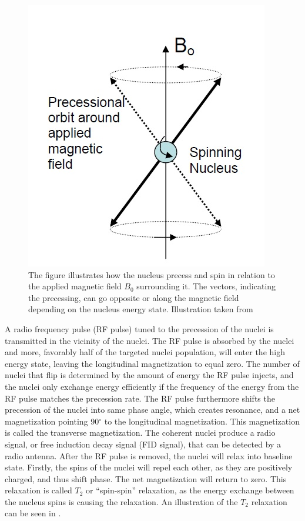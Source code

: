 \begin{figure}[H]                 
	\includegraphics[width=.375\textwidth]{figures/aBackground/nucleus_precess}  
	\caption{The figure illustrates how the nucleus precess and spin in relation to the applied magnetic field $B_0$ surrounding it. The vectors, indicating the precessing, can go opposite or along the magnetic field depending on the nucleus energy state. Illustration taken from \cite{Edwards}}
	\label{fig:back:nucleus_precess} 
\end{figure}  
A radio frequency pulse (RF pulse) tuned to the precession of the nuclei is transmitted in the vicinity of the nuclei. The RF pulse is absorbed by the nuclei and more, favorably half of the targeted nuclei population, will enter the high energy state, leaving the longitudinal magnetization to equal zero. The number of nuclei that flip is determined by the amount of energy the RF pulse injects, and the nuclei only exchange energy efficiently if the frequency of the energy from the RF pulse matches the precession rate. The RF pulse furthermore shifts the precession of the nuclei into same phase angle, which creates resonance, and a net magnetization pointing 90$^\circ$ to the longitudinal magnetization. This magnetization is called the transverse magnetization. The coherent nuclei produce a radio signal, or free induction decay signal (FID signal), that can be detected by a radio antenna. 
After the RF pulse is removed, the nuclei will relax into baseline state. Firstly, the spins of the nuclei will repel each other, as they are positively charged, and thus shift phase. The net magnetization will return to zero. This relaxation is called $T_2$ or “spin-spin” relaxation, as the energy exchange between the nucleus spins is causing the relaxation. An illustration of the $T_2$ relaxation can be seen in . 

